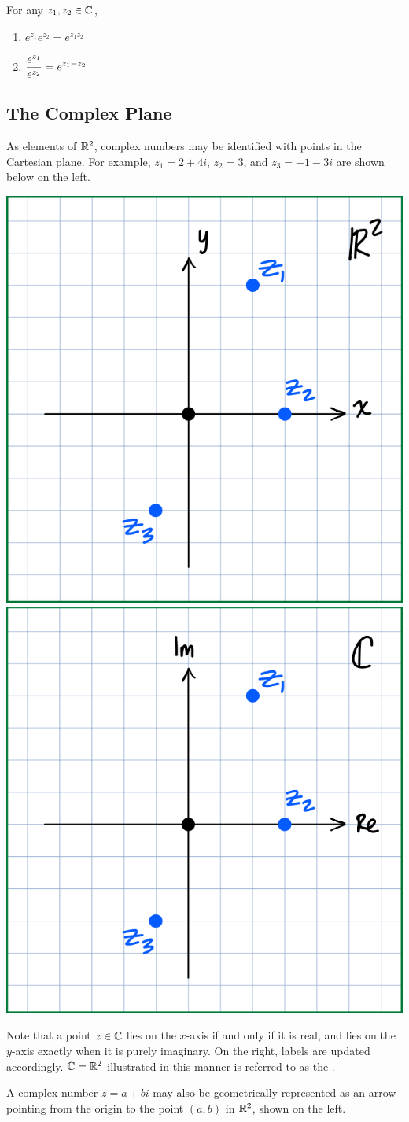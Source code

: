 \documentclass[11pt,fleqn,dvipsnames,usenames]{article}
\newcommand{\p}{\noindent}
\begin{document}
\properties For any $z_{1},z_{2}\in\mathbb{C}$,
\begin{enumerate}[(1)]
\item $e^{z_{1}}e^{z_{2}} = e^{z_{1}z_{2}}$
\item $\displaystyle{\frac{e^{z_{1}}}{e^{z_{2}}} = e^{z_{1} - z_{2}}}$
\end{enumerate}

\subsection{The Complex Plane}

\p As elements of $\mathbb{R}^{2}$, complex numbers may be identified with points in the Cartesian plane.  For example, $z_{1} = 2 + 4i$, $z_{2} = 3$, and $z_{3} = -1 -3i$ are shown below on the left.
\begin{center}
\includegraphics[width=0.3\linewidth]{complexplane}\hspace{4cm} \includegraphics[width=0.3\linewidth]{complexplaneupdated}
\end{center}

\p Note that a point $z\in\mathbb{C}$ lies on the $x$-axis if and only if it is real, and lies on the $y$-axis exactly when it is purely imaginary.  On the right, labels are updated accordingly.  $\mathbb{C} = \mathbb{R}^{2}$ illustrated in this manner is referred to as the .
\vsp

\p A complex number $z = a + bi$ may also be geometrically represented as an arrow pointing from the origin to the point $(a,b)$ in $\mathbb{R}^{2}$, shown on the left.
\vsp
\end{document}
